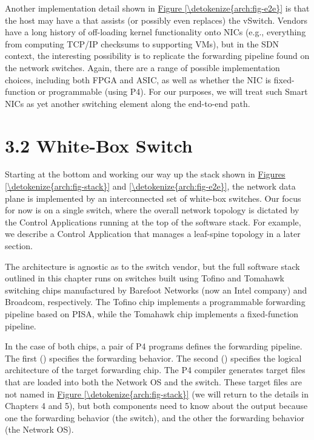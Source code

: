 \documentclass[letterpaper,11pt,english]{sphinxmanual}
\begin{document}
Another implementation detail shown in \hyperref[\detokenize{arch:fig-e2e}]{Figure \ref{\detokenize{arch:fig-e2e}}}
is that the host may have a 
that assists (or possibly even replaces) the vSwitch. Vendors have a
long history of off-loading kernel functionality onto NICs (e.g.,
everything from computing TCP/IP checksums to supporting VMs), but in
the SDN context, the interesting possibility is to replicate the
forwarding pipeline found on the network switches. Again, there are a
range of possible implementation choices, including both FPGA and
ASIC, as well as whether the NIC is fixed-function or programmable
(using P4). For our purposes, we will treat such Smart NICs as yet
another switching element along the end-to-end path.


\section{3.2 White-Box Switch}
\label{\detokenize{arch:white-box-switch}}
Starting at the bottom and working our way up the stack shown in
\hyperref[\detokenize{arch:fig-stack}]{Figures \ref{\detokenize{arch:fig-stack}}} and \hyperref[\detokenize{arch:fig-e2e}]{\ref{\detokenize{arch:fig-e2e}}}, the
network data plane is implemented by an interconnected set of
white-box switches. Our focus for now is on a single switch, where the
overall network topology is dictated by the Control Applications
running at the top of the software stack. For example, we describe a
Control Application that manages a leaf-spine topology in a later
section.

The architecture is agnostic as to the switch vendor, but the full
software stack outlined in this chapter runs on switches built using
Tofino and Tomahawk switching chips manufactured by Barefoot Networks
(now an Intel company) and Broadcom, respectively. The Tofino chip
implements a programmable forwarding pipeline based on PISA, while the
Tomahawk chip implements a fixed-function pipeline.

In the case of both chips, a pair of P4 programs defines the
forwarding pipeline. The first () specifies the
forwarding behavior. The second () specifies the logical
architecture of the target forwarding chip. The P4 compiler
generates target files that are loaded into both the Network OS and
the switch. These target files are not named in \hyperref[\detokenize{arch:fig-stack}]{Figure \ref{\detokenize{arch:fig-stack}}} (we will return to the details in Chapters 4 and 5), but
both components need to know about the output because one 
the forwarding behavior (the switch), and the other  the
forwarding behavior (the Network OS).
\end{document}
